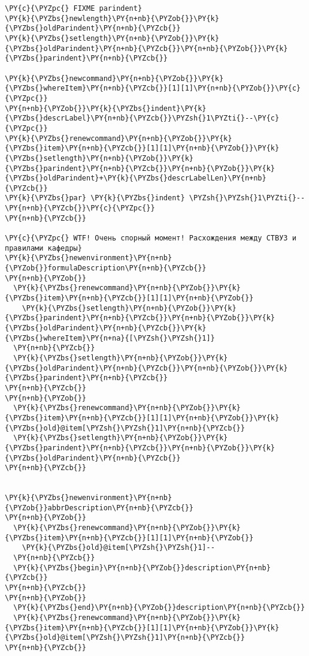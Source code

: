 \begin{Verbatim}[commandchars=\\\{\}]
\PY{c}{\PYZpc{} FIXME parindent}
\PY{k}{\PYZbs{}newlength}\PY{n+nb}{\PYZob{}}\PY{k}{\PYZbs{}oldParindent}\PY{n+nb}{\PYZcb{}}
\PY{k}{\PYZbs{}setlength}\PY{n+nb}{\PYZob{}}\PY{k}{\PYZbs{}oldParindent}\PY{n+nb}{\PYZcb{}}\PY{n+nb}{\PYZob{}}\PY{k}{\PYZbs{}parindent}\PY{n+nb}{\PYZcb{}}

\PY{k}{\PYZbs{}newcommand}\PY{n+nb}{\PYZob{}}\PY{k}{\PYZbs{}whereItem}\PY{n+nb}{\PYZcb{}}[1][1]\PY{n+nb}{\PYZob{}}\PY{c}{\PYZpc{}}
\PY{n+nb}{\PYZob{}}\PY{k}{\PYZbs{}indent}\PY{k}{\PYZbs{}descrLabel}\PY{n+nb}{\PYZcb{}}\PYZsh{}1\PYZti{}--\PY{c}{\PYZpc{}}
\PY{k}{\PYZbs{}renewcommand}\PY{n+nb}{\PYZob{}}\PY{k}{\PYZbs{}item}\PY{n+nb}{\PYZcb{}}[1][1]\PY{n+nb}{\PYZob{}}\PY{k}{\PYZbs{}setlength}\PY{n+nb}{\PYZob{}}\PY{k}{\PYZbs{}parindent}\PY{n+nb}{\PYZcb{}}\PY{n+nb}{\PYZob{}}\PY{k}{\PYZbs{}oldParindent}+\PY{k}{\PYZbs{}descrLabelLen}\PY{n+nb}{\PYZcb{}}
\PY{k}{\PYZbs{}par} \PY{k}{\PYZbs{}indent} \PYZsh{}\PYZsh{}1\PYZti{}--\PY{n+nb}{\PYZcb{}}\PY{c}{\PYZpc{}}
\PY{n+nb}{\PYZcb{}}

\PY{c}{\PYZpc{} WTF! Очень спорный момент! Расхождения между СТВУЗ и правилами кафедры}
\PY{k}{\PYZbs{}newenvironment}\PY{n+nb}{\PYZob{}}formulaDescription\PY{n+nb}{\PYZcb{}}
\PY{n+nb}{\PYZob{}}
  \PY{k}{\PYZbs{}renewcommand}\PY{n+nb}{\PYZob{}}\PY{k}{\PYZbs{}item}\PY{n+nb}{\PYZcb{}}[1][1]\PY{n+nb}{\PYZob{}}
    \PY{k}{\PYZbs{}setlength}\PY{n+nb}{\PYZob{}}\PY{k}{\PYZbs{}parindent}\PY{n+nb}{\PYZcb{}}\PY{n+nb}{\PYZob{}}\PY{k}{\PYZbs{}oldParindent}\PY{n+nb}{\PYZcb{}}\PY{k}{\PYZbs{}whereItem}\PY{n+na}{[\PYZsh{}\PYZsh{}1]}
  \PY{n+nb}{\PYZcb{}}
  \PY{k}{\PYZbs{}setlength}\PY{n+nb}{\PYZob{}}\PY{k}{\PYZbs{}oldParindent}\PY{n+nb}{\PYZcb{}}\PY{n+nb}{\PYZob{}}\PY{k}{\PYZbs{}parindent}\PY{n+nb}{\PYZcb{}}
\PY{n+nb}{\PYZcb{}} 
\PY{n+nb}{\PYZob{}}
  \PY{k}{\PYZbs{}renewcommand}\PY{n+nb}{\PYZob{}}\PY{k}{\PYZbs{}item}\PY{n+nb}{\PYZcb{}}[1][1]\PY{n+nb}{\PYZob{}}\PY{k}{\PYZbs{}old}@item[\PYZsh{}\PYZsh{}1]\PY{n+nb}{\PYZcb{}} 
  \PY{k}{\PYZbs{}setlength}\PY{n+nb}{\PYZob{}}\PY{k}{\PYZbs{}parindent}\PY{n+nb}{\PYZcb{}}\PY{n+nb}{\PYZob{}}\PY{k}{\PYZbs{}oldParindent}\PY{n+nb}{\PYZcb{}}
\PY{n+nb}{\PYZcb{}}


\PY{k}{\PYZbs{}newenvironment}\PY{n+nb}{\PYZob{}}abbrDescription\PY{n+nb}{\PYZcb{}}
\PY{n+nb}{\PYZob{}} 
  \PY{k}{\PYZbs{}renewcommand}\PY{n+nb}{\PYZob{}}\PY{k}{\PYZbs{}item}\PY{n+nb}{\PYZcb{}}[1][1]\PY{n+nb}{\PYZob{}}
    \PY{k}{\PYZbs{}old}@item[\PYZsh{}\PYZsh{}1]--
  \PY{n+nb}{\PYZcb{}}
  \PY{k}{\PYZbs{}begin}\PY{n+nb}{\PYZob{}}description\PY{n+nb}{\PYZcb{}}
\PY{n+nb}{\PYZcb{}} 
\PY{n+nb}{\PYZob{}}
  \PY{k}{\PYZbs{}end}\PY{n+nb}{\PYZob{}}description\PY{n+nb}{\PYZcb{}}
  \PY{k}{\PYZbs{}renewcommand}\PY{n+nb}{\PYZob{}}\PY{k}{\PYZbs{}item}\PY{n+nb}{\PYZcb{}}[1][1]\PY{n+nb}{\PYZob{}}\PY{k}{\PYZbs{}old}@item[\PYZsh{}\PYZsh{}1]\PY{n+nb}{\PYZcb{}} 
\PY{n+nb}{\PYZcb{}}


\end{Verbatim}
